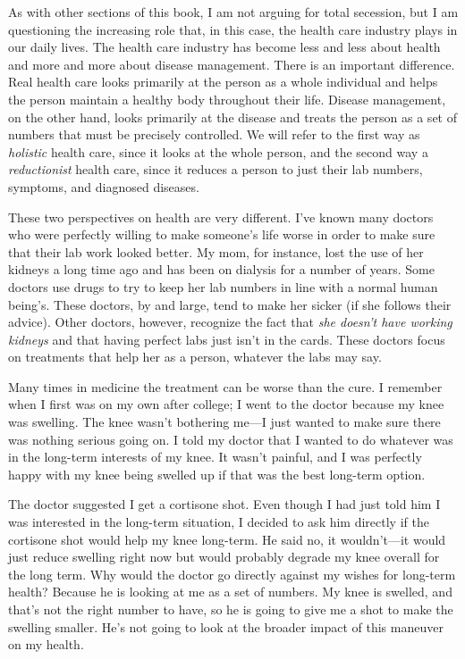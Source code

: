 As with other sections of this book, I am not arguing for total
secession, but I am questioning the increasing role that,
in this case, the health care industry plays in our daily lives. The
health care industry has become less and less about health and more and
more about disease management. There is an important difference. Real
health care looks primarily at the person as a whole individual and
helps the person maintain a healthy body throughout their life. Disease
management, on the other hand, looks primarily at the disease and
treats the person as a set of numbers that must be precisely
controlled. We will refer to the first way as \textit{holistic} health
care, since it looks at the whole person, and the second way a
\textit{reductionist} health care, since it reduces a person to just
their lab numbers, symptoms, and diagnosed diseases.

These two perspectives on health are very different.
I've known many doctors who were perfectly willing to
make someone's life worse in order to make sure that
their lab work looked better. My mom, for instance, lost the use of her
kidneys a long time ago and has been on dialysis for a number of years.
Some doctors use drugs to try to keep her lab numbers in line with a
normal human being’s. These doctors, by and large, tend to make her
sicker (if she follows their advice). Other doctors, however, recognize
the fact that \textit{she doesn't have working
kidneys} and that having perfect labs just isn't in
the cards.  These doctors focus on treatments that help her as a
person, whatever the labs may say.

Many times in medicine the treatment can be worse than the cure. I
remember when I first was on my own after college; I went to the doctor
because my knee was swelling. The knee wasn't
bothering me---I just wanted to make sure there was nothing serious
going on. I told my
doctor that I wanted to do whatever was in the long-term interests of
my knee. It wasn't painful, and I was perfectly happy
with my knee being swelled up if that was the best long-term option. 

The doctor suggested I get a cortisone shot. Even though I had just told
him I was interested in the long-term situation, I decided to ask him
directly if the cortisone shot would help my knee long-term. He said
no, it wouldn't---it would just reduce swelling right
now but would probably degrade my knee overall for the long term. Why
would the doctor go directly against my wishes for long-term health? 
Because he is looking at me as a set of numbers. My knee is swelled,
and that's not the right number to have, so he is
going to give me a shot to make the swelling smaller.
He's not going to look at the broader impact of this
maneuver on my health.

